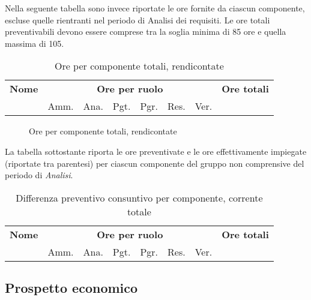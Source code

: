 	Nella seguente tabella sono invece riportate le ore fornite da ciascun componente, escluse quelle rientranti nel periodo di Analisi dei requisiti. 
	Le ore totali preventivabili devono essere comprese tra la soglia minima di 85 ore e quella massima di 105.

	\begin{table}[H]
	\centering
	\begin{tabular}{lccccccc}
	\toprule 
	    \textbf{Nome}  & \multicolumn{6}{c}{\textbf{Ore per ruolo}} & \textbf{Ore totali}\\
	     & Amm. & Ana. & Pgt. & Pgr. & Res. & Ver. \\
	    \midrule
	    
	    \bottomrule
	\end{tabular}
	\caption{Ore per componente totali, rendicontate}
	\end{table}


	\begin{figure}[H]
	\caption{Ore per componente totali, rendicontate}
	\end{figure}

	La tabella sottostante riporta le ore preventivate e le ore effettivamente impiegate (riportate tra parentesi) per ciascun componente del gruppo \GroupName{} non comprensive del periodo di \textit{Analisi}.

	\begin{center}
	\begin{table}[H]
	\begin{tabular}{lccccccc}
	\toprule
	    \textbf{Nome}  & \multicolumn{6}{c}{\textbf{Ore per ruolo}} & \textbf{Ore totali} \\
	     & Amm. & Ana. & Pgt. & Pgr. & Res. & Ver. & \\
	    \midrule
	    
	    \bottomrule
	\end{tabular}
	\caption{Differenza preventivo consuntivo per componente, corrente totale}
	\end{table}
	\end{center}


	\subsection{Prospetto economico}

